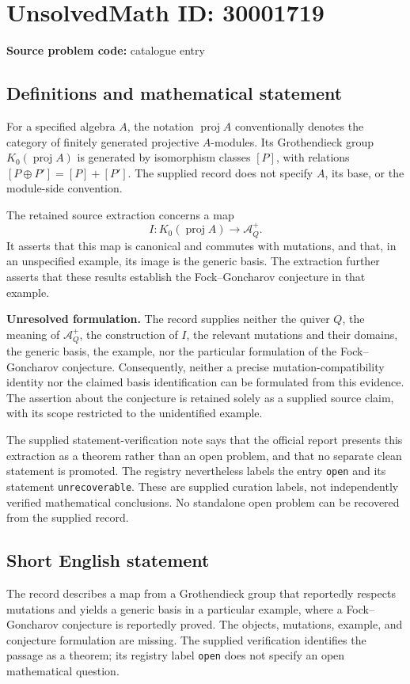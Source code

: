 \documentclass[11pt]{article}
\begin{document}
\section*{UnsolvedMath ID: 30001719}
\textbf{Source problem code:} catalogue entry
\subsection{Definitions and mathematical statement}
For a specified algebra \(A\), the notation \(\operatorname{proj}A\) conventionally denotes the category of finitely generated projective \(A\)-modules. Its Grothendieck group \(K_0(\operatorname{proj}A)\) is generated by isomorphism classes \([P]\), with relations \([P\oplus P']=[P]+[P']\). The supplied record does not specify \(A\), its base, or the module-side convention.

The retained source extraction concerns a map
\[
I:K_0(\operatorname{proj}A)\longrightarrow\mathcal A_Q^+.
\]
It asserts that this map is canonical and commutes with mutations, and that, in an unspecified example, its image is the generic basis. The extraction further asserts that these results establish the Fock--Goncharov conjecture in that example.

\textbf{Unresolved formulation.} The record supplies neither the quiver \(Q\), the meaning of \(\mathcal A_Q^+\), the construction of \(I\), the relevant mutations and their domains, the generic basis, the example, nor the particular formulation of the Fock--Goncharov conjecture. Consequently, neither a precise mutation-compatibility identity nor the claimed basis identification can be formulated from this evidence. The assertion about the conjecture is retained solely as a supplied source claim, with its scope restricted to the unidentified example.

The supplied statement-verification note says that the official report presents this extraction as a theorem rather than an open problem, and that no separate clean statement is promoted. The registry nevertheless labels the entry \texttt{open} and its statement \texttt{unrecoverable}. These are supplied curation labels, not independently verified mathematical conclusions. No standalone open problem can be recovered from the supplied record.
\subsection{Short English statement}
The record describes a map from a Grothendieck group that reportedly respects mutations and yields a generic basis in a particular example, where a Fock--Goncharov conjecture is reportedly proved. The objects, mutations, example, and conjecture formulation are missing. The supplied verification identifies the passage as a theorem; its registry label \texttt{open} does not specify an open mathematical question.
\end{document}
